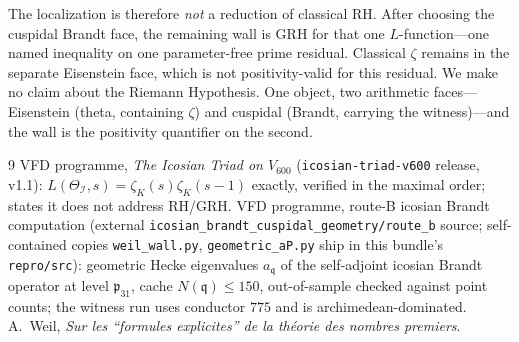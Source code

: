 \documentclass[11pt]{article}
\theoremstyle{definition}
\newcommand{\zetaK}{\zeta_{K}}
\newcommand{\Icos}{\mathcal{I}}
\newcommand{\fq}{\mathfrak{q}}
\begin{document}
The localization is therefore \emph{not} a reduction of classical RH. After choosing the
cuspidal Brandt face, the remaining wall is GRH for that one $L$-function---one named
inequality on one parameter-free prime residual. Classical $\zeta$ remains in the
separate Eisenstein face, which is not positivity-valid for this residual. We make no
claim about the Riemann Hypothesis. One object, two arithmetic faces---Eisenstein (theta,
containing $\zeta$) and cuspidal (Brandt, carrying the witness)---and the wall is the
positivity quantifier on the second.

\begin{thebibliography}{9}
 VFD programme, \emph{The Icosian Triad on $V_{600}$}
  (\texttt{icosian-triad-v600} release, v1.1): $L(\Theta_\Icos,s)=\zetaK(s)\zetaK(s-1)$
  exactly, verified in the maximal order; states it does not address RH/GRH.
 VFD programme, route-B icosian Brandt computation (external
  \texttt{icosian\_brandt\_cuspidal\_geometry/route\_b} source; self-contained copies
  \texttt{weil\_wall.py}, \texttt{geometric\_aP.py} ship in this bundle's
  \texttt{repro/src}): geometric Hecke eigenvalues $a_\fq$ of the self-adjoint
  icosian Brandt operator at level $\mathfrak p_{31}$, cache $N(\fq)\le150$,
  out-of-sample checked against point counts; the witness run uses conductor $775$ and is
  archimedean-dominated.
 A.~Weil, \emph{Sur les ``formules explicites'' de la th\'eorie des
  nombres premiers}.
\end{thebibliography}
\end{document}
